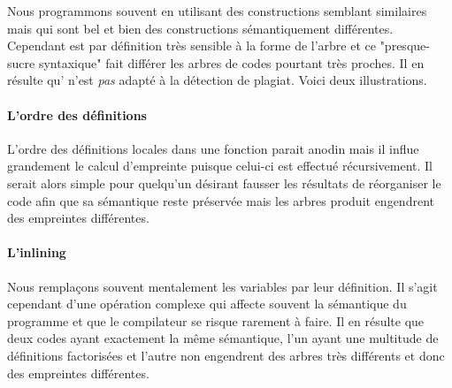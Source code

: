 
Nous programmons souvent en utilisant des constructions semblant
similaires mais qui sont bel et bien des constructions sémantiquement
différentes. Cependant {\Asak} est par définition très sensible à la
forme de l'arbre {\LambdaCode} et ce "presque-sucre syntaxique" fait
différer les arbres de codes pourtant très proches. Il en résulte
qu'{\Asak} n'est \emph{pas} adapté à la détection de plagiat. Voici deux illustrations.

\paragraph{L'ordre des définitions}

L'ordre des définitions locales dans une fonction parait anodin mais il influe grandement le calcul d'empreinte puisque celui-ci est effectué récursivement. Il serait alors simple pour quelqu'un désirant fausser les résultats de réorganiser le code afin que sa sémantique reste préservée mais les arbres {\LambdaCode} produit engendrent des empreintes différentes.

\paragraph{L'inlining}

Nous remplaçons souvent mentalement les variables par leur
définition. Il s'agit cependant d'une opération complexe qui affecte
souvent la sémantique du programme et que le compilateur se risque
rarement à faire. Il en résulte que deux codes ayant exactement la
même sémantique, l'un ayant une multitude de définitions factorisées
et l'autre non engendrent des arbres très différents et donc des empreintes différentes.
